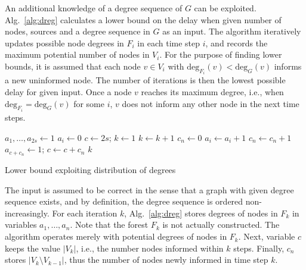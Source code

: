 An additional knowledge of a degree sequence of $G$ can be exploited. 
Alg.~\ref{alg:dreg} calculates a lower bound on the delay when given number of nodes, sources and a degree sequence in $G$ as an input.
The algorithm iteratively updates possible node degrees in $F_i$ in each time step $i$, and records the maximum potential number of nodes in $V_i$.
For the purpose of finding lower bounds, it is assumed that each node $v\in V_i$ with $\text{deg}_{F_i}(v)<\text{deg}_G(v)$ informs a new uninformed node.
The number of iterations is then the lowest possible delay for given input.
Once a node $v$ reaches its maximum degree, i.e., when $\text{deg}_{F_i}=\text{deg}_G(v)$ for some $i$, $v$ does not inform any other node in the next time steps.



\begin{algorithm}
$a_1,\dots,a_{2s}\leftarrow 1$\;%
 {
$a_i\leftarrow 0$\;
}
$c\leftarrow 2s$;
$k\leftarrow 1$\;
 {
$k\leftarrow k+1$\;
$c_n\leftarrow 0$\;
 {
	 {
		$a_i\leftarrow a_i + 1$\;
		$c_n\leftarrow c_n + 1$\;
		 {
			$a_{c+c_n}\leftarrow 1$; 
		}
	}
}
$c\leftarrow c + c_n$\;
}
\Return $k$\;
 \caption{Lower bound exploiting distribution of degrees}
\label{alg:dreg}
\end{algorithm}


The input is assumed to be correct in the sense that a graph with given degree sequence exists, and by definition, the degree sequence is ordered non-increasingly.
For each iteration $k$, Alg.~\ref{alg:dreg} stores degrees of nodes in $F_k$ in variables $a_1,\dots,a_n$.
Note that the forest $F_k$ is not actually constructed. 
The algorithm operates merely with potential degrees of nodes in $F_k$.
Next, variable $c$ keeps the value $|V_k|$, i.e., the number nodes informed within $k$ steps.
Finally, $c_n$ stores $|V_k\setminus V_{k-1}|$, thus the number of nodes newly informed in time step $k$.


